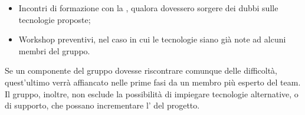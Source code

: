 \begin{itemize}
    \begin{itemize}
        \item Incontri di formazione con la , qualora dovessero sorgere dei dubbi sulle tecnologie proposte;
        \item Workshop preventivi, nel caso in cui le tecnologie siano già note ad alcuni membri del gruppo.
    \end{itemize}
    \par Se un componente del gruppo dovesse riscontrare comunque delle difficoltà, quest'ultimo verrà affiancato nelle prime fasi da un membro più esperto del team. Il gruppo, inoltre, non esclude la possibilità di impiegare tecnologie alternative, o di supporto, che possano incrementare l' del progetto.
\end{itemize}
